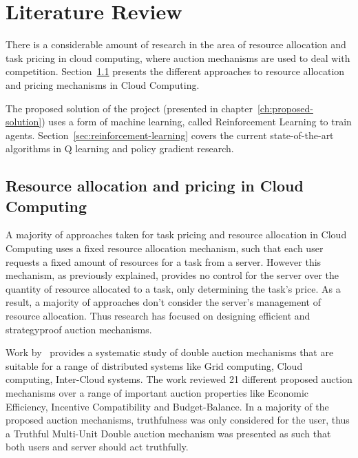 \chapter{Literature Review}\label{ch:literature-review}
There is a considerable amount of research in the area of resource allocation and task pricing in cloud computing,
where auction mechanisms are used to deal with competition.
Section~\ref{sec:resource-allocation-and-pricing-in-cloud-computing} presents the different approaches to resource
allocation and pricing mechanisms in Cloud Computing.

The proposed solution of the project (presented in chapter~\ref{ch:proposed-solution}) uses a form of
machine learning, called Reinforcement Learning to train agents. Section~\ref{sec:reinforcement-learning} covers the current
state-of-the-art algorithms in Q learning and policy gradient research.

\section{Resource allocation and pricing in Cloud Computing}\label{sec:resource-allocation-and-pricing-in-cloud-computing}
A majority of approaches taken for task pricing and resource allocation in Cloud Computing uses a fixed resource
allocation mechanism, such that each user requests a fixed amount of resources for a task from a server. However this
mechanism, as previously explained, provides no control for the server over the quantity of resource allocated to a task,
only determining the task's price. As a result, a majority of approaches don't consider the server's management of
resource allocation. Thus research has focused on designing efficient and strategyproof auction mechanisms.

Work by~\cite{KUMAR2017234} provides a systematic study of double auction mechanisms that are suitable for a range
of distributed systems like Grid computing, Cloud computing, Inter-Cloud systems. The work reviewed 21 different
proposed auction mechanisms over a range of important auction properties like Economic Efficiency,
Incentive Compatibility and Budget-Balance. In a majority of the proposed auction mechanisms, truthfulness was only
considered for the user, thus a Truthful Multi-Unit Double auction mechanism was presented as such that both users and
server should act truthfully.

